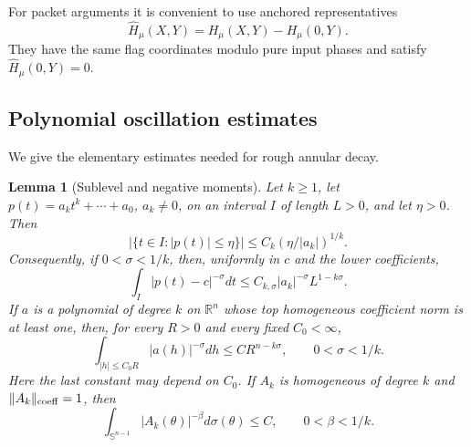 \documentclass[11pt]{article}
\numberwithin{equation}{section}
\newtheorem{lemma}[theorem]{Lemma}
\theoremstyle{remark}
\theoremstyle{definition}
\newcommand{\R}{\mathbb R}
\newcommand{\Sph}{\mathbb S}
\newcommand{\norm}[1]{\lVert #1\rVert}
\begin{document}
For packet arguments it is convenient to use anchored representatives
\begin{equation}\label{eq:anchoredbasis}
 \widehat H_\mu(X,Y)=H_\mu(X,Y)-H_\mu(0,Y).
\end{equation}
They have the same flag coordinates modulo pure input phases and satisfy
$\widehat H_\mu(0,Y)=0$.

\subsection{Polynomial oscillation estimates}

We give the elementary estimates needed for rough annular decay.

\begin{lemma}[Sublevel and negative moments]\label{lem:sublevel}
Let $k\ge1$, let $p(t)=a_kt^k+\cdots+a_0$, $a_k\ne0$, on an interval
$I$ of length $L>0$, and let $\eta>0$.  Then
\[
 |\{t\in I:|p(t)|\le\eta\}|\le C_k(\eta/|a_k|)^{1/k}.
\]
Consequently, if $0<\sigma<1/k$, then, uniformly in $c$ and the lower
coefficients,
\begin{equation}\label{eq:neg1d}
 \int_I|p(t)-c|^{-\sigma}dt
 \le C_{k,\sigma}|a_k|^{-\sigma}L^{1-k\sigma}.
\end{equation}
If $a$ is a polynomial of degree $k$ on $\R^n$ whose top homogeneous
coefficient norm is at least one, then, for every $R>0$ and every fixed
$C_0<\infty$,
\begin{equation}\label{eq:negn}
 \int_{|h|\le C_0R}|a(h)|^{-\sigma}dh\le C R^{n-k\sigma},
 \qquad 0<\sigma<1/k.
\end{equation}
Here the last constant may depend on $C_0$.  If $A_k$ is homogeneous of
degree $k$ and $\norm{A_k}_{\rm coeff}=1$, then
\begin{equation}\label{eq:negsphere}
 \int_{\Sph^{n-1}}|A_k(\theta)|^{-\beta}d\sigma(\theta)\le C,
 \qquad 0<\beta<1/k.
\end{equation}
\end{lemma}
\end{document}

